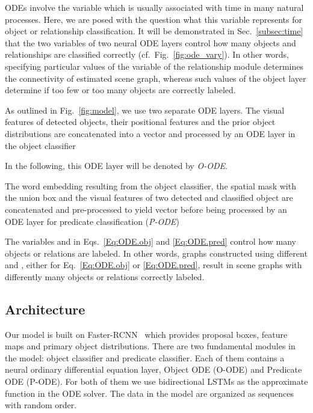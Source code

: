 \documentclass[runningheads]{llncs}
\begin{document}
ODEs involve the variable  which is usually associated with time in many natural processes. Here, we are posed with the question what this variable represents for object or relationship classification. It will be demonstrated in Sec.~\ref{subsec:time} that the two variables of two neural ODE layers control how many objects and relationships are classified correctly (cf.~Fig.~\ref{fig:ode_vary}). In other words, specifying particular values of the variable of the relationship module  determines the connectivity of estimated scene graph, whereas such values of the object layer determine if too few or too many objects are correctly labeled.

As outlined in Fig.~\ref{fig:model}, we use two separate ODE layers. The visual features of detected objects, their positional features and the prior object distributions are concatenated into a vector  and processed by an ODE layer in the object classifier

In the following, this ODE layer will be denoted by \emph{O-ODE}.

The word embedding resulting from the object classifier, the spatial mask with the union box and the visual features of two detected and classified object are concatenated and pre-processed to yield vector  before being processed by an ODE layer for predicate classification (\emph{P-ODE})


The variables  and  in Eqs.~\eqref{Eq:ODE.obj} and \eqref{Eq:ODE.pred} control how many objects or relations are labeled. In other words, graphs constructed using different  and , either for Eq.~\eqref{Eq:ODE.obj} or \eqref{Eq:ODE.pred}, result in scene graphs with differently many objects or relations correctly labeled. 


\subsection{Architecture}
\label{Sec:Archi}
Our model is built on Faster-RCNN~\cite{ren2015faster} which provides proposal boxes, feature maps and primary object distributions. There are two fundamental modules in the model: object classifier and predicate classifier. Each of them contains a neural ordinary differential equation layer, Object ODE (O-ODE) and Predicate ODE (P-ODE). For both of them we use bidirectional LSTMs as the approximate function in the ODE solver. The data in the model are organized as sequences with random order.
\end{document}
